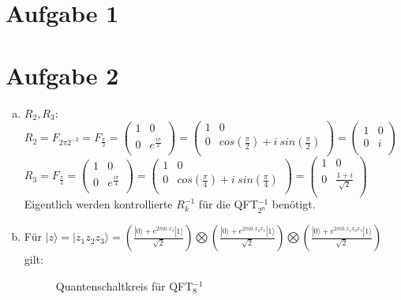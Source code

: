 \documentclass[a4paper]{scrartcl}
\begin{document}
\section*{Aufgabe 1}

\newpage
\section*{Aufgabe 2}
\begin{enumerate}[a)]
\item
$R_2, R_3:$\\
$R_2=F_{2\pi 2^{-2}}=F_{\frac{\pi}{2}} = 
\begin{pmatrix}
1 & 0 \\ 0 & e^{\frac{i \pi}{2}} \\
\end{pmatrix} = 
\begin{pmatrix}
1 & 0 \\ 0 & cos(\frac{\pi}{2})+i~sin(\frac{\pi}{2})\\
\end{pmatrix} = \begin{pmatrix}
1 & 0 \\ 0 & i\\
\end{pmatrix}$\\
$R_3=F_{\frac{\pi}{4}} = 
\begin{pmatrix}
1 & 0 \\ 0 & e^{\frac{i \pi}{4}} \\
\end{pmatrix} = 
\begin{pmatrix}
1 & 0 \\ 0 & cos(\frac{\pi}{4})+i~sin(\frac{\pi}{4})\\
\end{pmatrix}= \begin{pmatrix}
1 & 0 \\ 0 & \frac{1+i}{\sqrt{2}}\\
\end{pmatrix}$ \\
Eigentlich werden kontrollierte $R_k^{-1}$ für die QFT$_{2^n}^{-1}$ benötigt.

\item Für $|z\rangle = |z_1 z_2 z_3\rangle= (\frac{|0\rangle+e^{2\pi i0.x_3} |1\rangle }{\sqrt{2}})\bigotimes(\frac{|0\rangle+e^{2\pi i0.x_2x_3} |1\rangle }{\sqrt{2}})\bigotimes(\frac{|0\rangle+e^{2\pi i0.x_1x_2x_3} |1\rangle }{\sqrt{2}})$ gilt:

\begin{figure}[htp] 
\caption{Quantenschaltkreis für QFT$_{8}^{-1}$}
\end{figure}


\end{enumerate}
\end{document}
